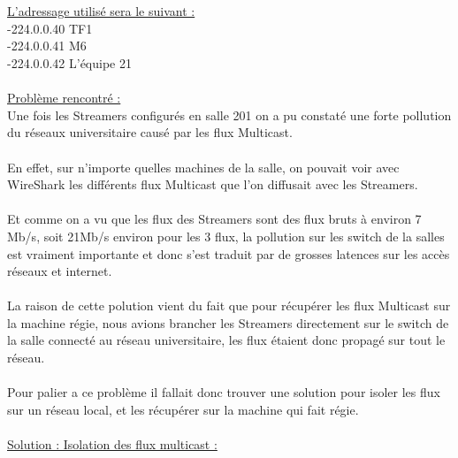 \documentclass{report}
\begin{document}
    \hfill{\\\\}
    
    \underline{L’adressage utilisé sera le suivant :}\\
    
     -224.0.0.40  \rightarrow TF1
     \\
     
     -224.0.0.41  \rightarrow M6
     \\
     
     -224.0.0.42  \rightarrow L’équipe 21
     \\
     \\
     
     \underline{Problème rencontré : }\\
     
     Une fois les Streamers configurés en salle 201 on a pu constaté une forte pollution du réseaux universitaire causé par les flux Multicast.
    \\
    \\
    En effet, sur n’importe quelles machines de la salle, on pouvait voir avec WireShark les différents flux Multicast que l’on diffusait avec les Streamers.
    \\
    \\
    Et comme on a vu que les flux des Streamers sont des flux bruts à environ 7 Mb/s, soit 21Mb/s environ pour les 3 flux, la pollution sur les switch de la salles est vraiment importante et donc s’est traduit par de grosses latences sur les accès réseaux et internet. 
    \\
    \\
    La raison de cette polution vient du fait que pour récupérer les flux Multicast sur la machine régie, nous avions brancher les Streamers directement sur le switch de la salle connecté au réseau universitaire, les flux étaient donc propagé sur tout le réseau.
    \\
    \\
    Pour palier a ce problème il fallait donc trouver une solution pour isoler les flux sur un réseau local, et les récupérer sur la machine qui fait régie.
    \\
    \\
    
    \underline{Solution : Isolation des flux multicast :}\\
\end{document}
